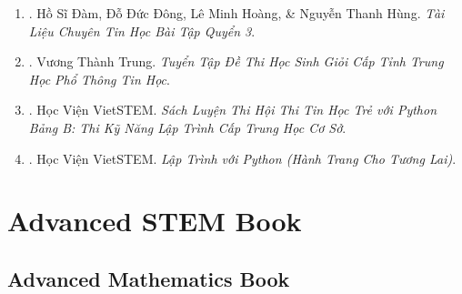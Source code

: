 \documentclass{article}
\begin{document}
\begin{enumerate}
	\item \cite{TL_chuyen_Tin_BT_quyen_3}. Hồ Sĩ Đàm, Đỗ Đức Đông, Lê Minh Hoàng, \& Nguyễn Thanh Hùng. \textit{Tài Liệu Chuyên Tin Học Bài Tập Quyển 3}.\hfill{}
	\item \cite{Trung_HSG_THPT_Tin}. Vương Thành Trung. \textit{Tuyển Tập Đề Thi Học Sinh Giỏi Cấp Tỉnh Trung Học Phổ Thông Tin Học}.\hfill{}
	\item \cite{VietSTEM2021}. Học Viện VietSTEM. \textit{Sách Luyện Thi Hội Thi Tin Học Trẻ  với Python Bảng B: Thi Kỹ Năng Lập Trình Cấp Trung Học Cơ Sở}.\hfill{}
	\item \cite{VietSTEM2022}. Học Viện VietSTEM. \textit{Lập Trình với Python (Hành Trang Cho Tương Lai)}.\hfill{}
\end{enumerate}


\section{Advanced STEM Book}

\subsection{Advanced Mathematics Book}
\end{document}
